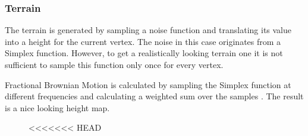 \subsubsection{Terrain}
The terrain is generated by sampling a noise function and translating its value into a height for the current vertex. The noise in this case originates from a Simplex function. However, to get a realistically looking terrain one it is not sufficient to sample this function only once for every vertex.

Fractional Brownian Motion is calculated by sampling the Simplex function at different frequencies and calculating a weighted sum over the samples \cite{FracBrownMotion}. The result is a nice looking height map. 

\begin{figure}[H]
<<<<<<< HEAD


\end{figure}
